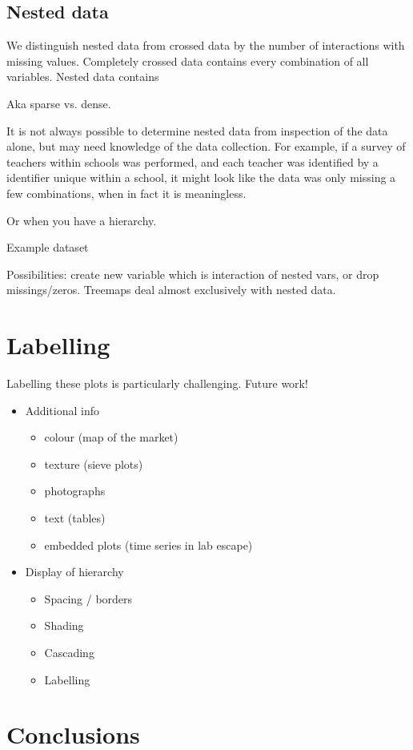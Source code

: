 \documentclass[letterpaper,oneside]{scrartcl}
\begin{document}
\subsection{Nested data}
\label{sub:nested_data}

We distinguish nested data from crossed data by the number of interactions with missing values.  Completely crossed data contains every combination of all variables.  Nested data contains 

Aka sparse vs. dense.

It is not always possible to determine nested data from inspection of the data alone, but may need knowledge of the data collection.  For example, if a survey of teachers within schools was performed, and each teacher was identified by a identifier unique within a school, it might look like the data was only missing a few combinations, when in fact it is meaningless.  

Or when you have a hierarchy.

Example dataset

Possibilities: create new variable which is interaction of nested vars, or drop missings/zeros.  Treemaps deal almost exclusively with nested data.

\section{Labelling}
\label{sec:legends}

Labelling these plots is particularly challenging.  Future work!

\begin{itemize}
  \item Additional info 
  \begin{itemize}
    \item colour (map of the market)
    \item texture (sieve plots)
    \item photographs
    \item text (tables)
    \item embedded plots (time series in lab escape)
  \end{itemize}
  
  \item Display of hierarchy
  \begin{itemize}
    \item Spacing / borders
    \item Shading
    \item Cascading
    \item Labelling
  \end{itemize}
\end{itemize}

\section{Conclusions} %
\label{sec:conclusions}



\end{document}
